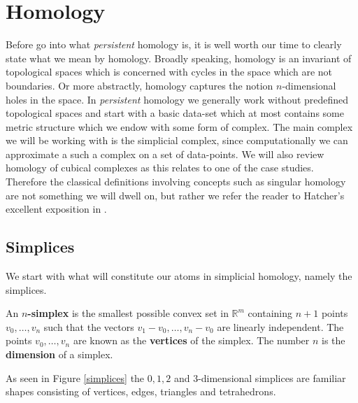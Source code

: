 \chapter{Homology}
Before go into what \textit{persistent} homology is, it is well worth our time to clearly state what we mean by homology. Broadly speaking, homology is an invariant of topological spaces which is concerned with cycles in the space which are not boundaries. Or more abstractly, homology captures the notion $n$-dimensional holes in the space. In \textit{persistent} homology we generally work without predefined topological spaces and start with a basic data-set which at most contains some metric structure which we endow with some form of complex. The main complex we will be working with is the simplicial complex, since computationally we can approximate a such a complex on a set of data-points. We will also review homology of cubical complexes as this relates to one of the case studies. Therefore the classical definitions involving concepts such as singular homology are not something we will dwell on, but rather we refer the reader to Hatcher's excellent exposition in \cite{hatcher2002}.


\section{Simplices}
We start with what will constitute our atoms in simplicial homology, namely the simplices.
\begin{definition}
An \textbf{$n$-simplex} is the smallest possible convex set in $\mathbb{R}^{m}$ containing $n+1$ points $v_{0},\dots,v_{n}$ such that the vectors $v_{1}-v_{0}, \dots, v_{n} - v_{0}$ are linearly independent. The points $v_{0},\dots,v_{n}$ are known as the \textbf{vertices} of the simplex. The number $n$ is the \textbf{dimension} of a simplex.
\end{definition}
As seen in Figure \ref{simplices} the $0,1,2$ and $3$-dimensional simplices are familiar shapes consisting of vertices, edges, triangles and tetrahedrons.

